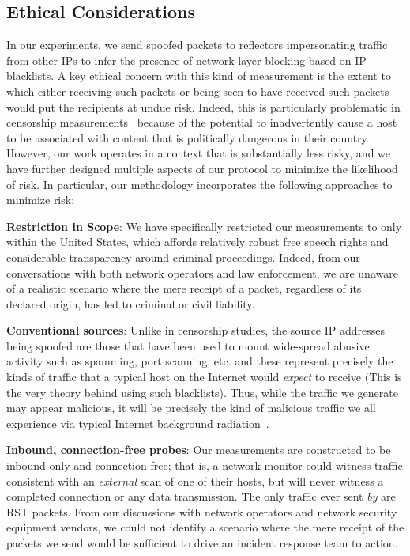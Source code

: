 \subsection{Ethical Considerations}
\label{sec:ethics}

In our experiments, we send spoofed packets to reflectors
impersonating traffic from other IPs to infer the presence of
network-layer blocking based on IP blacklists.  
A key ethical concern with this kind of
measurement is the extent to which either receiving such packets or
being seen to have received such packets would put the recipients at
undue risk.  Indeed, this is particularly problematic in censorship 
measurements~\cite{ensafi2014detecting, pearce2017augur}
because of the potential to inadvertently cause a host to be 
associated with content that is politically dangerous in their country.
However, our work operates in a context that is substantially less
risky, and we have further designed multiple aspects of our protocol 
to minimize the likelihood of risk. In particular, our methodology 
incorporates the following approaches to minimize risk:

\textbf{Restriction in Scope}:  We have specifically restricted our
  measurements to only {} within the United States, which
  affords relatively robust free speech rights and
  considerable transparency around criminal proceedings. Indeed, from
  our conversations with both network operators and law enforcement,
  we are unaware of a realistic scenario where the mere receipt of a
  packet, regardless of its declared origin, has led to criminal or civil liability.

\textbf{Conventional sources}:  Unlike in censorship studies, the source
  IP addresses being spoofed are those that have been used to mount wide-spread
  abusive activity such as spamming, port scanning,
  etc. and these represent precisely the kinds of traffic that a
  typical host on the Internet would \emph{expect} to receive 
  (This is the very theory behind using such blacklists).  Thus, 
  while the traffic we generate may appear malicious, it will be
  precisely the kind of malicious traffic we all experience via
  typical Internet background radiation~\cite{pang2004characteristics}.

\textbf{Inbound, connection-free probes}:  Our measurements are
  constructed to be inbound only and connection free; that is, a
  network monitor could witness traffic consistent with an
  \emph{external} scan of one of their hosts, but will never witness a
  completed connection or any data transmission. The
  only traffic ever sent \emph{by} {} are RST packets.  
  From our discussions with network operators and network security 
  equipment vendors, we could not identify 
  a scenario where the mere receipt of the packets we send would be 
  sufficient to drive an incident response team to action.


